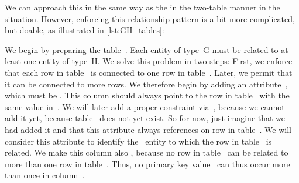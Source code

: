 We can approach this in the same way as the in the two-table manner in the  situation.
However, enforcing this relationship pattern is a bit more complicated, but doable, as illustrated in \cref{lst:GH_tables}:

We begin by preparing the table~.
Each entity of type~G must be related to at least one entity of type~H.
We solve this problem in two steps:
First, we enforce that each row in table~ is connected to one row in table~.
Later, we permit that it can be connected to more rows.
We therefore begin by adding an attribute~, which must be .
This column should always point to the row in table~ with the same value in~.
We will later add a proper  constraint via~, because we cannot add it yet, because table~ does not yet exist.
So for now, just imagine that we had added it and that this attribute always references on row in table~.
We will consider this attribute to identify the ~entity to which the row in table~ is related.
We make this column also , because no row in table~ can be related to more than one row in table~.
Thus, no primary key value~ can thus occur more than once in column~.

